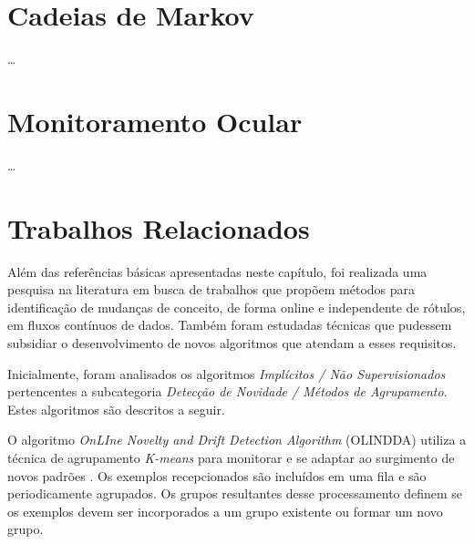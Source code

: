 \documentclass[msc, classic, a4paper]{ufbathesis}
\begin{document}
\section{Cadeias de Markov}

\ldots

\section{Monitoramento Ocular}

\ldots

\section{Trabalhos Relacionados}

Além das referências básicas apresentadas neste capítulo, foi realizada uma pesquisa na literatura em busca de trabalhos que propõem métodos para identificação de mudanças de conceito, de forma online e independente de rótulos, em fluxos contínuos de dados. Também foram estudadas técnicas que pudessem subsidiar o desenvolvimento de novos algoritmos que atendam a esses requisitos.

Inicialmente, foram analisados os algoritmos \textit{Implícitos / Não Supervisionados} pertencentes a subcategoria \textit{Detecção de Novidade / Métodos de Agrupamento}. Estes algoritmos são descritos a seguir.


O algoritmo \textit{OnLIne Novelty and Drift Detection Algorithm} (OLINDDA) utiliza a técnica de agrupamento \textit{K-means} para monitorar e se adaptar ao surgimento de novos padrões \cite{Spinosa:2007:OCA:1244002.1244107}.
Os exemplos recepcionados são incluídos em uma fila e são periodicamente agrupados. Os grupos resultantes desse processamento definem se os exemplos devem ser incorporados a um grupo existente ou formar um novo grupo.
\end{document}
